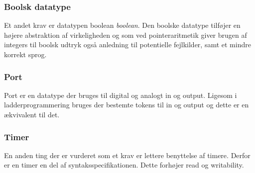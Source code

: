 \subsubsection*{Boolsk datatype}
Et andet krav er datatypen boolean \textit{boolean}. Den boolske datatype tilføjer en højere abstraktion af virkeligheden og som ved pointeraritmetik giver brugen af integers til boolsk udtryk også anledning til potentielle fejlkilder, samt et mindre korrekt sprog.

\subsubsection*{Port}
Port er en datatype der bruges til digital og analogt in og output. Ligesom i ladderprogrammering bruges der bestemte tokens til in og output og dette er en ækvivalent til det.

\subsubsection*{Timer}
En anden ting der er vurderet som et krav er lettere benyttelse af timere. Derfor er en timer en del af syntaksspecifikationen. Dette forhøjer read og writability.